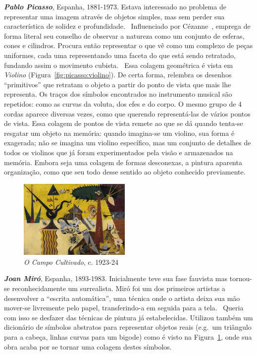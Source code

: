 \textbf{\emph{Pablo Picasso}}, Espanha, 1881-1973. Estava interessado no
problema de representar uma imagem através de objetos simples, mas sem perder
sua característica de solidez e profundidade.~\cite{daix,gombrich} Influenciado
por Cézanne~\cite{rishel}, emprega de forma literal seu conselho de observar a
natureza como um conjunto de esferas, cones e cilindros. Procura então
representar o que vê como um complexo de peças uniformes, cada uma representando
uma faceta do que está sendo retratado, fundando assim o movimento
cubista.~\cite{barr,golding} Essa colagem geométrica é vista em \emph{Violino}
(Figura~\ref{fig:picasso:violino}). De certa forma, relembra os desenhos
``primitivos'' que retratam o objeto a partir do ponto de vista que mais lhe
representa. Os traços dos símbolos encontrados no instrumento musical são
repetidos: como as curvas da voluta, dos efes e do corpo. O mesmo grupo de 4
cordas aparece diversas vezes, como que querendo representá-las de vários pontos
de vista. Essa colagem de pontos de vista remete ao que se dá quando tenta-se
resgatar um objeto na memória: quando imagina-se um violino, sua forma é
exagerada; não se imagina um violino específico, mas um conjunto de detalhes de
todos os violinos que já foram experimentados pela visão e armazenados na
memória. Embora seja uma colagem de formas desconexas, a pintura aparenta
organização, como que seu todo desse sentido ao objeto conhecido
previamente.~\cite{gombrich}

\begin{figure}
  \begin{center}
    \includegraphics[width=0.48\textwidth]{figs/miro_campo.png}
  \end{center}
  \caption{\emph{O Campo Cultivado}, c. 1923-24}
  \label{fig:miro:campo}
\end{figure}


\textbf{\emph{Joan Miró}}, Espanha, 1893-1983. Inicialmente teve sua fase
fauvista mas tornou-se reconhecidamente um surrealista. Miró foi um dos
primeiros artistas a desenvolver a ``escrita automática'', uma técnica onde o
artista deixa sua mão mover-se livremente pelo papel, transferindo-a em seguida
para a tela.~\cite{montagu} Queria com isso se desfazer das técnicas de pintura
já estabelecidas. Utilizou também um dicionário de símbolos abstratos para
representar objetos reais (e.g.\ um triângulo para a cabeça, linhas curvas para
um bigode) como é visto na Figura~\ref{fig:miro:campo}, onde sua obra acaba por
se tornar uma colagem destes símbolos.~\cite{stich}

